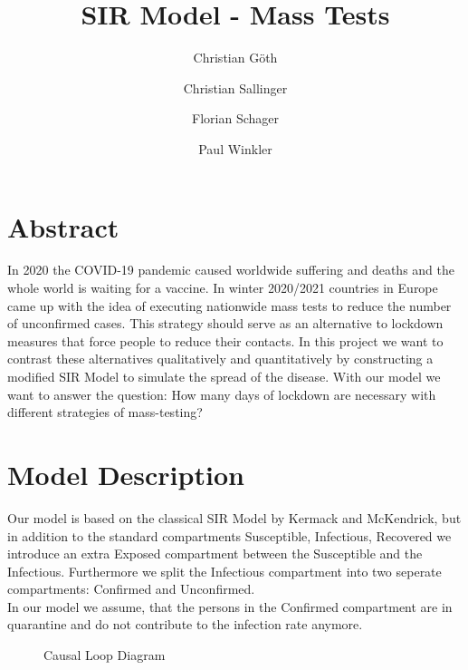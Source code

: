 \documentclass[a4paper,11pt]{scrartcl}
\begin{document}
\subject{Modeling \& Simulation}
\title{SIR Model - Mass Tests}

\publishers{Betreuer: Martin Bicher }


\author{
Christian Göth \and
Christian Sallinger \and
Florian Schager \and
Paul Winkler
}

\maketitle

\section*{Abstract}

In 2020 the COVID-19 pandemic caused worldwide suffering and deaths and the
whole world is waiting for a vaccine. In winter 2020/2021 countries in Europe
came up with the idea of executing nationwide mass tests to reduce the number
of unconfirmed cases. This strategy should serve as an alternative to
lockdown measures that force people to reduce their contacts.
In this project we want to contrast these alternatives qualitatively and quantitatively
by constructing a modified SIR Model to simulate the spread of the disease.
With our model we want to answer the question:
How many days of lockdown are necessary with different strategies of mass-testing?


\newpage

\tableofcontents

\newpage

\section{Model Description}

Our model is based on the classical SIR Model by Kermack and McKendrick,
but in addition to the standard compartments Susceptible, Infectious, Recovered
we introduce an extra Exposed compartment between the Susceptible and the Infectious.
Furthermore we split the Infectious compartment into two seperate compartments:
Confirmed and Unconfirmed. \\
In our model we assume, that the persons in the Confirmed compartment are in
quarantine and do not contribute to the infection rate anymore.


\begin{figure}
  \caption{Causal Loop Diagram}
  
\end{figure}
\end{document}

